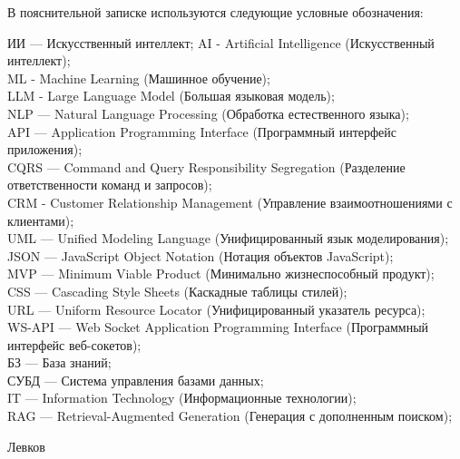 \label{sec:reduction}

В пояснительной записке используются следующие условные обозначения:

ИИ — Искусственный интеллект;
AI - Artificial Intelligence (Искусственный интеллект);\\
ML - Machine Learning (Машинное обучение);\\
LLM - Large Language Model (Большая языковая модель);\\
NLP — Natural Language Processing (Обработка естественного языка);\\
API — Application Programming Interface (Программный интерфейс приложения);\\
CQRS — Command and Query Responsibility Segregation (Разделение ответственности команд и запросов);\\
CRM - Customer Relationship Management (Управление взаимоотношениями с клиентами);\\
UML — Unified Modeling Language (Унифицированный язык моделирования);\\
JSON — JavaScript Object Notation (Нотация объектов JavaScript);\\
MVP — Minimum Viable Product (Минимально жизнеспособный продукт);\\
CSS — Cascading Style Sheets (Каскадные таблицы стилей);\\
URL — Uniform Resource Locator (Унифицированный указатель ресурса);\\
WS-API — Web Socket Application Programming Interface (Программный интерфейс веб-сокетов);\\
БЗ — База знаний;\\
СУБД — Система управления базами данных;\\
IT — Information Technology (Информационные технологии);\\
RAG — Retrieval-Augmented Generation (Генерация с дополненным поиском);

Левков